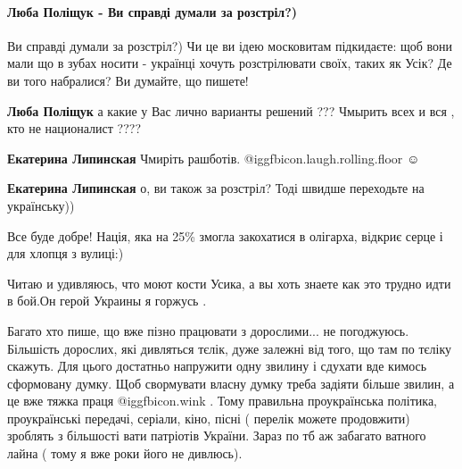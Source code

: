  
 
 
 
 
\paragraph{Люба Поліщук - Ви справді думали за розстріл?)}
\label{sec:27_09_2021.fb.sentsov_oleg.1.usik.cmt.3.polischuk_rasstrel}

\begin{itemize} %
Ви справді думали за розстріл?)
Чи це ви ідею московитам підкидаєте: щоб вони мали що в зубах носити - українці хочуть розстрілювати своїх, таких як Усік?
Де ви того набралися? Ви думайте, що пишете!

\begin{itemize} %
\textbf{Люба Поліщук} а какие у Вас лично варианты решений ??? Чмырить всех и вся , кто не националист ????

\textbf{Екатерина Липинская}
Чмиріть рашботів. @igg{fbicon.laugh.rolling.floor} ☺

\textbf{Екатерина Липинская} о, ви також за розстріл?
Тоді швидше переходьте на українську))
\end{itemize} %

Все буде добре!
Нація, яка на 25\% змогла закохатися в олігарха, відкриє серце і для хлопця з вулиці:)

Читаю и удивляюсь, что моют кости Усика, а вы хоть знаете как это трудно идти в бой.Он герой Украины я горжусь .


Багато хто пише, що вже пізно працювати з дорослими... не погоджуюсь. Більшість
дорослих, які дивляться тєлік, дуже залежні від того, що там по тєліку скажуть.
Для цього достатньо напружити одну звилину і сдухати вде кимось сформовану
думку. Щоб свормувати власну думку треба задіяти більше звилин, а це вже тяжка
праця  @igg{fbicon.wink} . Тому правильна проукраїнська політика, проукраїнські передачі,
серіали, кіно, пісні ( перелік можете продовжити) зроблять з більшості вати
патріотів України. Зараз по тб аж забагато ватного лайна ( тому я вже роки його
не дивлюсь).


\end{itemize}
